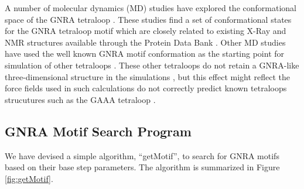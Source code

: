 A  number  of  molecular  dynamics  (MD)  studies  have  explored  the
conformational   space  of   the  GNRA   tetraloop  \cite{cornell1995,
  sorin2002, spackova2010,  depaul2010}. These  studies find a  set of
conformational states  for the GNRA tetraloop motif  which are closely
related  to existing X-Ray  and NMR  structures available  through the
Protein Data Bank \cite{depaul2010, sorin2002}.  Other MD studies have
used the well known GNRA  motif conformation as the starting point for
simulation  of other  tetraloops  \cite{srinivasan1998}.  These  other
tetraloops do  not retain  a GNRA-like three-dimensional  structure in
the simulations  \cite{srinivasan1998}, but this  effect might reflect
the force  fields used in such calculations  \cite{cornell1995} do not
correctly  predict  known  tetraloops  strucutures such  as  the  GAAA
tetraloop \cite{spackova2010}.

\subsection{GNRA Motif Search Program}
We have devised  a simple algorithm, ``getMotif'', to  search for GNRA
motifs  based  on  their  base  step  parameters.   The  algorithm  is
summarized in Figure \ref{fig:getMotif}.

